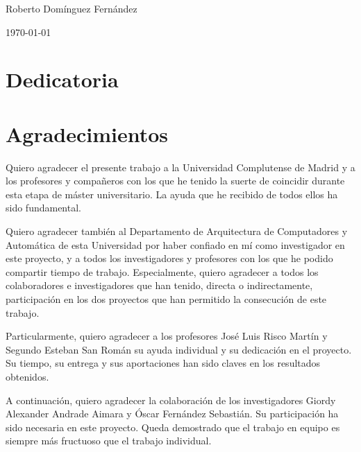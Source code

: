 \documentclass[11pt,a4paper]{book}
\begin{document}
\vspace{5cm}

\begin{center}
\large Roberto Domínguez Fernández\\

\vspace{0.5cm}

\today
\end{center}

\cleardoublepage
\chapter*{Dedicatoria}

\begin{flushright}
\begin{minipage}[c]{8.5cm}
\end{minipage}
\end{flushright}

\cleardoublepage
\chapter*{Agradecimientos}
Quiero agradecer el presente trabajo a la Universidad Complutense de Madrid y a los profesores y compañeros con los que he tenido la suerte de coincidir durante esta etapa de máster universitario. La ayuda que he recibido de todos ellos ha sido fundamental.

Quiero agradecer también al Departamento de Arquitectura de Computadores y Automática de esta Universidad por haber confiado en mí como investigador en este proyecto, y a todos los investigadores y profesores con los que he podido compartir tiempo de trabajo. Especialmente, quiero agradecer a todos los colaboradores e investigadores que han tenido, directa o indirectamente, participación en los dos proyectos que han permitido la consecución de este trabajo. 

Particularmente, quiero agradecer a los profesores José Luis Risco Martín y Segundo Esteban San Román su ayuda individual y su dedicación en el proyecto. Su tiempo, su entrega y sus aportaciones han sido claves en los resultados obtenidos.

A continuación, quiero agradecer la colaboración de los investigadores Giordy Alexander Andrade Aimara y Óscar Fernández Sebastián. Su participación ha sido necesaria en este proyecto. Queda demostrado que el trabajo en equipo es siempre más fructuoso que el trabajo individual.
\end{document}
